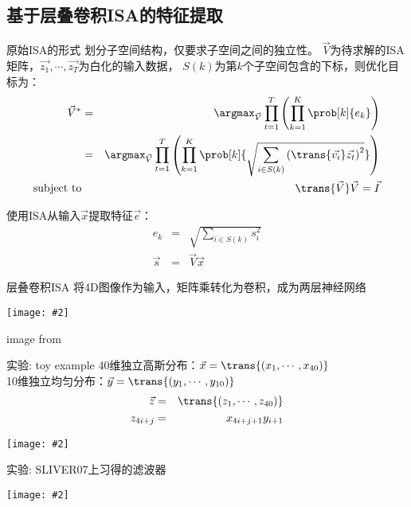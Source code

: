 \documentclass {beamer}
\newcommand{\addgraph}[2]{\begin{center}
\texttt{[image: \#2]}\end{center}}
\begin{document}
\subsection{基于层叠卷积ISA的特征提取}
\begin{frame}{原始ISA的形式}
    划分子空间结构，仅要求子空间之间的独立性。
    $\vec{V}$为待求解的ISA矩阵，$\vec{z_1},\cdots,\vec{z_T}$为白化的输入数据，
    $S(k)$为第$k$个子空间包含的下标，则优化目标为：
    \begin{eqnarray}
        \vec{V}^* &=& \argmax_{\vec{V}}
                \prod_{t=1}^T \left(
                \prod_{k=1}^K\prob[k]{e_k} \right) \nonumber \\
            &=& \argmax_{\vec{V}}
                \prod_{t=1}^T \left(
                \prod_{k=1}^K\prob[k]{\sqrt{
                    \sum_{i\in S(k)}\left(\trans{\vec{v_i}}\vec{z_t}\right)^2}
                }\right) \nonumber \\
            \text{subject to} && \trans{\vec{V}}\vec{V}=\vec{I}
        \label{eqn:isa:1}
    \end{eqnarray}

    使用ISA从输入$\vec{x}$提取特征$\vec{e}$：
    \begin{eqnarray}
        e_k &=&  \sqrt{\sum_{i\in S(k)} s_i^2} \nonumber \\
        \vec{s} &=& \vec{V}\vec{x}
        \label{eqn:isa:extract}
    \end{eqnarray}
\end{frame}

\begin{frame}{层叠卷积ISA}
    将4D图像作为输入，矩阵乘转化为卷积，成为两层神经网络
    \addgraph{0.8}{res/isa-stack.png}
    {\tiny image from \cite{wu2013unsupervised}}
\end{frame}

\begin{frame}{实验: toy example}
    40维独立高斯分布：$\vec{x}=\trans{(x_1,\cdots,x_{40})}$ \\
    10维独立均匀分布：$\vec{y}=\trans{(y_1, \cdots, y_{10})}$
    \begin{eqnarray}
        \vec{z} &=& \trans{(z_1, \cdots, z_{40})} \nonumber \\
        z_{4i+j} &=& x_{4i+j+1}y_{i+1}
    \end{eqnarray}
    \addgraph{0.8}{res/isa-toyeg.eps}
\end{frame}

\begin{frame}{实验: SLIVER07上习得的滤波器}
    \addgraph{0.9}{res/isa-filter.png}
\end{frame}
\end{document}
